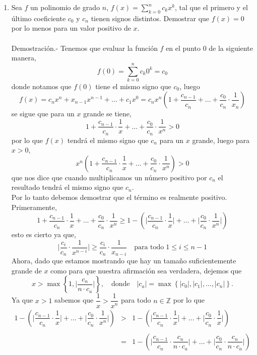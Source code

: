 \begin{enumerate}[\bfseries 1.]

    \item Sea $f$ un polinomio de grado $n$, $f(x)=\sum\limits_{k=0}^n c_k x^k$, tal que el primero y el último coeficiente $c_0$ y $c_n$ tienen signos distintos. Demostrar que $f(x)=0$ por lo menos para un valor positivo de $x$.\\\\
	Demostración.-\; Tenemos que evaluar la función $f$ en el punto $0$ de la siguiente manera,
	$$f(0)=\sum_{k=0}^n c_k 0^k = c_0$$
	donde notamos que $f(0)$ tiene el mismo signo que $c_0$, luego 
	$$f(x)=c_nx^n + x_{n-1}x^{n-1}+\ldots + c_1 x^0 = c_nx^n \left(1+\dfrac{c_{n-1}}{c_n}+\ldots+\dfrac{c_0}{c_n}\cdot \dfrac{1}{x_n}\right)$$
	se sigue que para un $x$ grande se tiene,
	$$1+\dfrac{c_{n-1}}{c_n}\cdot \dfrac{1}{x}+\ldots + \dfrac{c_0}{c_n}\cdot \dfrac{1}{x^n}>0$$
	por lo que $f(x)$ tendrá el mismo signo que $c_n$ para un $x$ grande, luego para $x>0$,
	$$x^n\left(1+\dfrac{c_{n-1}}{c_n}\cdot \dfrac{1}{x}+\ldots + \dfrac{c_0}{c_n}\cdot \dfrac{1}{x^n}\right)>0$$
	que nos dice que cuando multiplicamos un número positivo por $c_n$ el resultado tendrá el mismo signo que $c_n$.\\
	Por lo tanto debemos demostrar que el término es realmente positivo. Primeramente,
	$$1+\dfrac{c_{n-1}}{c_n}\cdot \dfrac{1}{x}+\ldots + \dfrac{c_0}{c_n}\cdot \dfrac{1}{x^n}\geq 1-\left(\bigg| \dfrac{c_{n-1}}{c_n} \cdot \dfrac{1}{x}\bigg| +\ldots + \bigg|\dfrac{c_0}{c_n}\cdot \dfrac{1}{x^n}\bigg|\right)$$
	esto es cierto ya que,
	$$\bigg|\dfrac{c_i}{c_n}\cdot \dfrac{1}{x^{n-i}}\bigg|\geq \dfrac{c_i}{c_n}\cdot \dfrac{1}{x_{n-i}}\quad \mbox{para todo} \; 1\leq i \leq n-1$$
	Ahora, dado que estamos mostrando que hay un tamaño suficientemente grande de $x$ como para que nuestra afirmación sea verdadera, dejemos que
	$$x>\max\left\{ 1, \bigg|\dfrac{c_n}{n\cdot c_a}\bigg|\right\}, \quad \mbox{donde}\quad |c_a|=\max\left\{|c_0|,|c_1|,\ldots,|c_n|\right\}.$$
	Ya que $x>1$ sabemos que $\dfrac{1}{x}>\dfrac{1}{x^n}$ para todo $n \in \mathbb{Z}$ por lo que 
	$$\begin{array}{rcl}
	    1-\left(\bigg| \dfrac{c_{n-1}}{c_n} \cdot \dfrac{1}{x}\bigg| +\ldots + \bigg|\dfrac{c_0}{c_n}\cdot \dfrac{1}{x^n}\bigg|\right) & > & 1-\left(\bigg| \dfrac{c_{n-1}}{c_n} \cdot \dfrac{1}{x}\bigg| +\ldots + \bigg|\dfrac{c_0}{c_n}\cdot \dfrac{1}{x}\bigg|\right) \\\\ 
							      &=&1-\left(\bigg|\dfrac{c_{n-1}}{c_n}\cdot \dfrac{c_n}{n\cdot c_a}\bigg|+\ldots + \bigg|\dfrac{c_0}{c_n}\cdot \dfrac{c_n}{n\cdot c_a}\bigg|\right)\\\\

\end{array}$$
\end{enumerate}
